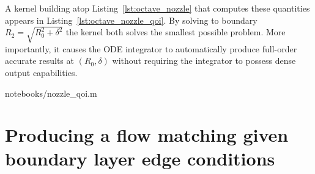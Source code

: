 \documentclass[letterpaper,11pt,nointlimits,reqno]{amsart}
\begin{document}
A kernel building atop Listing~\ref{lst:octave_nozzle} that computes these
quantities appears in Listing~\ref{lst:octave_nozzle_qoi}. By solving to
boundary $R_2 = \sqrt{R_0^2 + \delta^2}$ the kernel both solves the smallest
possible problem.  More importantly, it causes the ODE integrator to
automatically produce full-order accurate results at $\left(R_0,\delta\right)$
without requiring the integrator to possess dense output capabilities.


                {notebooks/nozzle_qoi.m}

\section{Producing a flow matching given boundary layer edge conditions}
\end{document}
